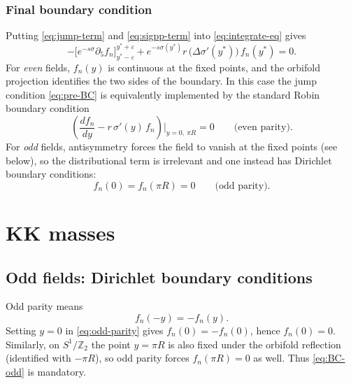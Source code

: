 \documentclass[11pt]{article}
\begin{document}
\subsubsection*{Final boundary condition}
Putting \eqref{eq:jump-term} and \eqref{eq:sigpp-term} into \eqref{eq:integrate-eq} gives
\begin{equation}
-\Big[e^{-s\sigma}\partial_5 f_n\Big]_{y^\ast-\varepsilon}^{y^\ast+\varepsilon}
+e^{-s\sigma(y^\ast)} r\,\Big(\Delta\sigma'(y^\ast)\Big)\,f_n(y^\ast)=0.
\label{eq:pre-BC}
\end{equation}
For \emph{even} fields, $f_n(y)$ is continuous at the fixed points, and the orbifold projection
identifies the two sides of the boundary. In this case the jump condition \eqref{eq:pre-BC}
is equivalently implemented by the standard Robin boundary condition
\begin{equation}
\boxed{
\left(\frac{df_n}{dy}-r\,\sigma'(y)\,f_n\right)\Big|_{y=0,\ \pi R}=0
}
\qquad \text{(even parity).}
\label{eq:BC-even}
\end{equation}
For \emph{odd} fields, antisymmetry forces the field to vanish at the fixed points (see below),
so the distributional term is irrelevant and one instead has Dirichlet boundary conditions:
\begin{equation}
\boxed{
f_n(0)=f_n(\pi R)=0
}
\qquad \text{(odd parity).}
\label{eq:BC-odd}
\end{equation}

\section{KK masses}
\subsection{Odd fields: Dirichlet boundary conditions}

Odd parity means
\begin{equation}
f_n(-y)=-f_n(y).
\label{eq:odd-parity}
\end{equation}
Setting $y=0$ in \eqref{eq:odd-parity} gives $f_n(0)=-f_n(0)$, hence $f_n(0)=0$.
Similarly, on $S^1/\mathbb{Z}_2$ the point $y=\pi R$ is also fixed under the orbifold reflection
(identified with $-\pi R$), so odd parity forces $f_n(\pi R)=0$ as well. Thus \eqref{eq:BC-odd}
is mandatory.
\end{document}
